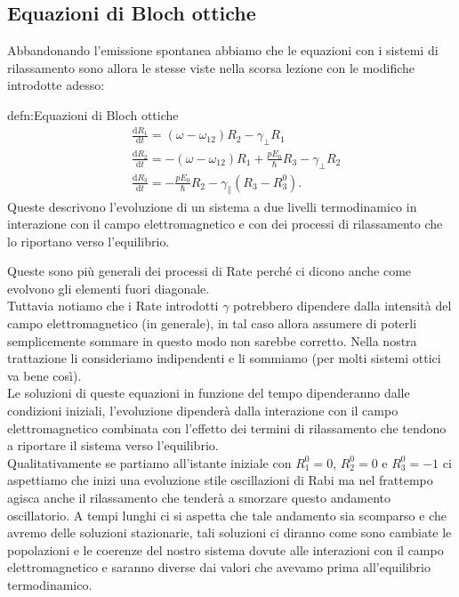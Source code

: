 \subsection{Equazioni di Bloch ottiche}%
Abbandonando l'emissione spontanea abbiamo che le equazioni con i sistemi di rilassamento sono allora le stesse viste nella scorsa lezione con le modifiche introdotte adesso:
\begin{defn}{defn:Equazioni di Bloch ottiche}
\[\begin{aligned}
    &\frac{\text{d} R_1}{\text{d} t} = \left(\omega-\omega_{12}\right)R_2
    - \gamma_\perp R_1\\
    &\frac{\text{d} R_2}{\text{d} t} = - \left(\omega-\omega_{12}\right)R_1 +
    \frac{pE_0}{\hbar }R_3-\gamma_\perp R_2\\
    &\frac{\text{d} R_3}{\text{d} t} = -\frac{pE_0}{\hbar }R_2 - 
    \gamma_\parallel\left(R_3-R_3^0\right)
.\end{aligned}\]
Queste descrivono l'evoluzione di un sistema a due livelli termodinamico in interazione con il campo elettromagnetico e con dei processi di rilassamento che lo riportano verso l'equilibrio. 
\end{defn}
Queste sono più generali dei processi di Rate perché ci dicono anche come evolvono gli elementi fuori diagonale.\\
Tuttavia notiamo che i Rate introdotti $\gamma$ potrebbero dipendere dalla intensità del campo elettromagnetico (in generale), in tal caso allora assumere di poterli semplicemente sommare in questo modo non sarebbe corretto. 
Nella nostra trattazione li consideriamo indipendenti e li sommiamo (per molti sistemi ottici va bene così).\\
Le soluzioni di queste equazioni in funzione del tempo dipenderanno dalle condizioni iniziali, l'evoluzione dipenderà dalla interazione con il campo elettromagnetico combinata con l'effetto dei termini di rilassamento che tendono a riportare il sistema verso l'equilibrio.\\
Qualitativamente se partiamo all'istante iniziale con $R_1^0=0$, $R_2^0 = 0$ e $R_3^0= -1$ ci aspettiamo che inizi una evoluzione stile oscillazioni di Rabi ma nel frattempo agisca anche il rilassamento che tenderà a smorzare questo andamento oscillatorio. 
A tempi lunghi ci si aspetta che tale andamento sia scomparso e che avremo delle soluzioni stazionarie, tali soluzioni ci diranno come sono cambiate le popolazioni e le coerenze del nostro sistema dovute alle interazioni con il campo elettromagnetico e saranno diverse dai valori che avevamo prima all'equilibrio termodinamico. \\
